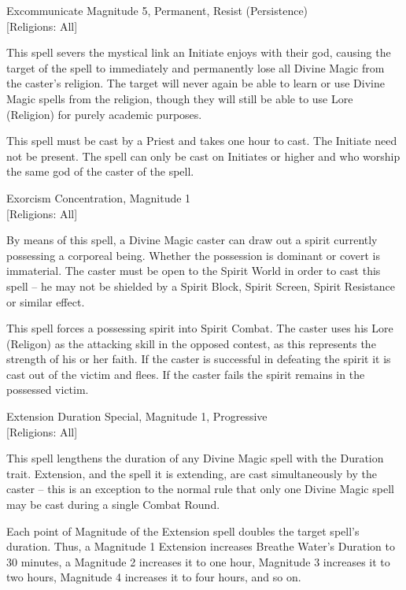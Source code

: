\begin{rpg-spell}
{Excommunicate}
{Magnitude 5, Permanent, Resist (Persistence)\\{[Religions: All]}}

This spell severs the mystical link an Initiate enjoys with their god, causing the target of the spell to immediately and permanently lose all Divine Magic from the caster’s religion. The target will never again be able to learn or use Divine Magic spells from the religion, though they will still be able to use Lore (Religion) for purely academic purposes. 

This spell must be cast by a Priest and takes one hour to cast. The Initiate need not be present. The spell can only be cast on Initiates or higher and who worship the same god of the caster of the spell.
\end{rpg-spell}

\begin{rpg-spell}
{Exorcism}
{Concentration, Magnitude 1\\{[Religions: All]}}

By means of this spell, a Divine Magic caster can draw out a spirit currently possessing a corporeal being. Whether the possession is dominant or covert is immaterial. The caster must be open to the Spirit World in order to cast this spell – he may not be shielded by a Spirit Block, Spirit Screen, Spirit Resistance or similar effect. 

This spell forces a possessing spirit into Spirit Combat. The caster uses his Lore (Religon) as the attacking skill in the opposed contest, as this represents the strength of his or her faith. If the caster is successful in defeating the spirit it is cast out of the victim and flees. If the caster fails the spirit remains in the possessed victim.
\end{rpg-spell}

\begin{rpg-spell}
{Extension}
{Duration Special, Magnitude 1, Progressive\\{[Religions: All]}}

This spell lengthens the duration of any Divine Magic spell with the Duration trait. Extension, and the spell it is extending, are cast simultaneously by the caster – this is an exception to the normal rule that only one Divine Magic spell may be cast during a single Combat Round. 

Each point of Magnitude of the Extension spell doubles the target spell’s duration. Thus, a Magnitude 1 Extension increases Breathe Water’s Duration to 30 minutes, a Magnitude 2 increases it to one hour, Magnitude 3 increases it to two hours, Magnitude 4 increases it to four hours, and so on.
\end{rpg-spell}


